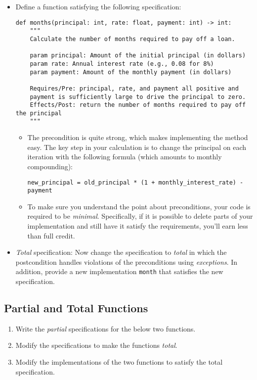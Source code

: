 \documentclass[oneside,11pt,dvipsnames]{book}
\newcommand{\code}[1]{\texttt{#1}}
\begin{document}
\begin{itemize}


\item Define a function satisfying the following specification:

\begin{lstlisting}
def months(principal: int, rate: float, payment: int) -> int:
    """
    Calculate the number of months required to pay off a loan.
    
    param principal: Amount of the initial principal (in dollars)
    param rate: Annual interest rate (e.g., 0.08 for 8%)
    param payment: Amount of the monthly payment (in dollars)
    
    Requires/Pre: principal, rate, and payment all positive and 
    payment is sufficiently large to drive the principal to zero.
    Effects/Post: return the number of months required to pay off the principal
    """
\end{lstlisting}

\begin{itemize}
    \item The precondition is quite strong, which makes implementing the method easy. The key step in your calculation is to change the principal on each iteration with the following formula (which amounts to monthly compounding):
    \begin{lstlisting}
new_principal = old_principal * (1 + monthly_interest_rate) - payment
    \end{lstlisting}

    \item To make sure you understand the point about preconditions, your code is required to be \emph{minimal}. Specifically, if it is possible to delete parts of your implementation and still have it satisfy the requirements, you'll earn less than full credit.
\end{itemize}
\item \emph{Total} specification: Now change the specification to \emph{total} in which the postcondition handles violations of the preconditions using \emph{exceptions}. In addition, provide a new implementation \code{month} that satisfies the new specification.
\end{itemize}
\subsection{Partial and Total Functions}

\begin{enumerate}
    \item Write the \emph{partial} specifications for the below two functions.
    \item Modify the specifications to make the functions \emph{total}.
    \item Modify the implementations of the two functions to satisfy the total specification.
\end{enumerate}
\end{document}

